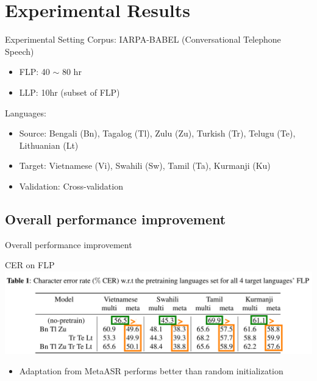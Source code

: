 \documentclass{beamer}
\begin{document}
\section{Experimental Results}
\begin{frame}[t]{Experimental Setting}
  Corpus: IARPA-BABEL (Conversational Telephone Speech)
  \begin{itemize}
    \item FLP: 40 $\sim$ 80 hr
    \item LLP: 10hr (subset of FLP)
  \end{itemize}
  \pause
  Languages:
  \begin{itemize}
    \item Source: Bengali (Bn), Tagalog (Tl), Zulu (Zu), Turkish (Tr), Telugu (Te), Lithuanian (Lt)
    \item Target: Vietnamese (Vi), Swahili (Sw), Tamil (Ta), Kurmanji (Ku)
    \item Validation: Cross-validation
  \end{itemize}
\end{frame}

\subsection{Overall performance improvement}
\begin{frame}
	\begin{center}
    \LARGE{Overall performance improvement}
	\end{center}
\end{frame}
\begin{frame}[t]{CER on FLP}
  \center \includegraphics[width=1.0\textwidth]{fig/flp-hl1.png}

  \begin{itemize}
    \item Adaptation from MetaASR performs better than random initialization
  \end{itemize}
\end{frame}
\end{document}
